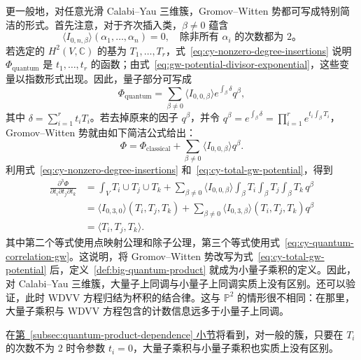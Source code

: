 更一般地，对任意光滑 Calabi--Yau 三维簇，Gromov--Witten 势都可写成特别简洁的形式。首先注意，对于齐次插入类，$\beta\ne0$ 蕴含
\begin{equation}\label{eq:cy-nonzero-degree-insertions}
\langle I_{0,n,\beta}\rangle(\alpha_1,\ldots,\alpha_n)=0,
\quad\text{除非所有 $\alpha_i$ 的次数都为 $2$。}
\end{equation}
若选定的 $H^2(V,\mathbb C)$ 的基为 $T_1,\ldots,T_r$，式~\eqref{eq:cy-nonzero-degree-insertions} 说明 $\Phi_{\mathrm{quantum}}$ 是 $t_1,\ldots,t_r$ 的函数；由式~\eqref{eq:gw-potential-divisor-exponential}，这些变量以指数形式出现。因此，量子部分可写成
\[
\Phi_{\mathrm{quantum}}=\sum_{\beta\ne0}\langle I_{0,0,\beta}\rangle
 e^{\int_\beta\delta}q^\beta,
\]
其中 $\delta=\sum_{i=1}^rt_iT_i$。若去掉原来的因子 $q^\beta$，并令
$q^\beta=e^{\int_\beta\delta}=\prod_{i=1}^re^{t_i\int_\beta T_i}$，Gromov--Witten 势就由如下简洁公式给出：
\begin{equation}\label{eq:cy-total-gw-potential}
\Phi=\Phi_{\mathrm{classical}}+\sum_{\beta\ne0}\langle I_{0,0,\beta}\rangle q^\beta.
\end{equation}
利用式~\eqref{eq:cy-nonzero-degree-insertions} 和~\eqref{eq:cy-total-gw-potential}，得到
\begin{equation}\label{eq:cy-potential-three-derivatives}
\begin{aligned}
\frac{\partial^3\Phi}{\partial t_i\partial t_j\partial t_k}
&=\int_V T_i\cup T_j\cup T_k+
\sum_{\beta\ne0}\langle I_{0,0,\beta}\rangle
\int_\beta T_i\int_\beta T_j\int_\beta T_k\,q^\beta\\
&=\langle I_{0,3,0}\rangle(T_i,T_j,T_k)+
\sum_{\beta\ne0}\langle I_{0,3,\beta}\rangle(T_i,T_j,T_k)q^\beta\\
&=\langle T_i,T_j,T_k\rangle.
\end{aligned}
\end{equation}
其中第二个等式使用点映射公理和除子公理，第三个等式使用式~\eqref{eq:cy-quantum-correlation-gw}。这说明，将 Gromov--Witten 势改写为式~\eqref{eq:cy-total-gw-potential} 后，定义~\ref{def:big-quantum-product} 就成为小量子乘积的定义。因此，对 Calabi--Yau 三维簇，大量子上同调与小量子上同调实质上没有区别。还可以验证，此时 WDVV 方程归结为杯积的结合律。这与 $\mathbb P^2$ 的情形很不相同：在那里，大量子乘积与 WDVV 方程包含的计数信息远多于小量子上同调。

在\hyperref[subsec:quantum-product-dependence]{第~\ref*{subsec:quantum-product-dependence} 小节}将看到，对一般的簇，只要在 $T_i$ 的次数不为 $2$ 时令参数 $t_i=0$，大量子乘积与小量子乘积也实质上没有区别。

